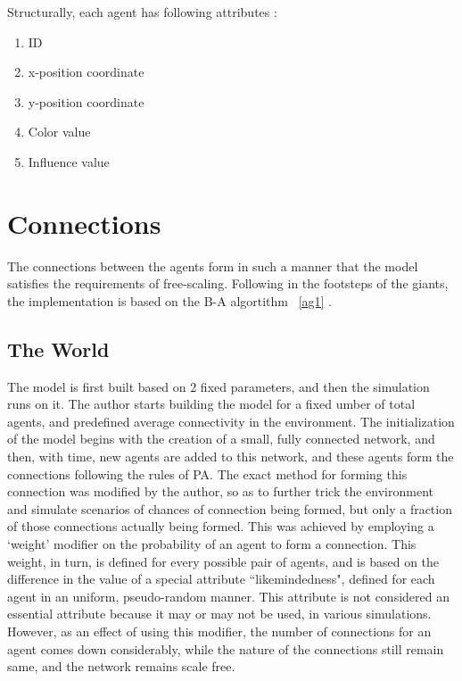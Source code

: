 Structurally, each agent has following attributes :

\begin{enumerate}
\item ID
\item x-position coordinate
\item y-position coordinate
\item Color value
\item Influence value
\end{enumerate}


\section{Connections}
The connections between the agents form in such a manner that the model satisfies the requirements of free-scaling. 
Following in the footsteps of the giants, the implementation is based on the B-A algortithm ~\ref{ag1} .

\subsection{The World}
The model is first built based on 2 fixed parameters, and then the simulation runs on it.
The author starts building the model for a fixed umber of total agents, and predefined average connectivity in the environment.
The initialization of the model begins with the creation of a small, fully connected network, and then, with time, new agents are added to this network, and these agents form the connections following the rules of PA.
The exact method for forming this connection was modified by the author, so as to further trick the environment and simulate scenarios of chances of connection being formed, but only a fraction of those connections actually being formed. This was achieved by employing a `weight' modifier on the probability of an agent to form a connection. This weight, in turn, is defined for every possible pair of agents, and is based on the difference in the value of a special attribute ``likemindedness", defined for each agent in an uniform, pseudo-random manner.
This attribute is not considered an essential attribute because it may or may not be used, in various simulations. However, as an effect of using this modifier, the number of connections for an agent comes down considerably, while the nature of the connections still remain same, and the network remains scale free.


